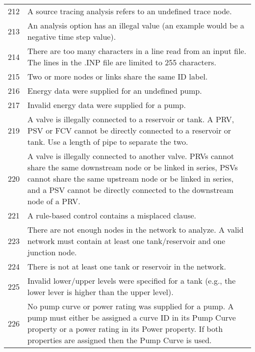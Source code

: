 \begin{longtable}{ c p{12cm}}
212& A source tracing analysis refers to an undefined trace node.\\[6pt]

213& An analysis option has an illegal value (an example would be a negative time
step value).\\[6pt]

214& There are too many characters in a line read from an input file. The lines in
the .INP file are limited to 255 characters.\\[6pt]

215& Two or more nodes or links share the same ID label. \\[6pt]

216& Energy data were supplied for an undefined pump. \\[6pt]

217& Invalid energy data were supplied for a pump. \\[6pt]

219& A valve is illegally connected to a reservoir or tank. A PRV, PSV or FCV
cannot be directly connected to a reservoir or tank. Use a length of pipe to
separate the two.      \\[6pt]

220& A valve is illegally connected to another valve. PRVs cannot share the same
downstream node or be linked in series, PSVs cannot share the same
upstream node or be linked in series, and a PSV cannot be directly connected
to the downstream node of a PRV.\\[6pt]

221& A rule-based control contains a misplaced clause.\\[6pt]

223& There are not enough nodes in the network to analyze. A valid network must
contain at least one tank/reservoir and one junction node.\\[6pt]

224& There is not at least one tank or reservoir in the network.\\[6pt]

225& Invalid lower/upper levels were specified for a tank (e.g., the lower lever is
higher than the upper level).\\[6pt]

226& No pump curve or power rating was supplied for a pump. A pump must either
be assigned a curve ID in its Pump Curve property or a power rating in its
Power property. If both properties are assigned then the Pump Curve is used.\\[6pt]


\end{longtable}
